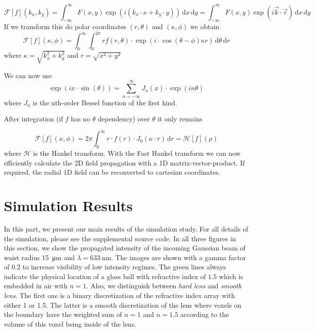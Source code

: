 \documentclass[a4paper,12pt]{article}
\begin{document}
\begin{equation}
\mathcal{F}[f](k_x, k_y) = \int_{-\infty}^{\infty} F(x,y) \exp(i (k_x \cdot x + k_y \cdot y)) \,\mathrm{d}x\, \mathrm{d}y = \int_{-\infty}^{\infty} F(x,y) \exp(i \vec k \cdot \vec r) \,\mathrm{d}x\, \mathrm{d}y
\end{equation}
If we transform this do polar coordinates $(r, \theta)$ and $(\kappa, \phi)$ we obtain
\begin{equation}
\mathcal{F}[f](\kappa, \phi) = \int_{0}^{\infty} \int_{0}^{2\pi} r f(r, \theta)\cdot \exp(i \cdot \cos(\theta - \phi) \kappa r)  \,\mathrm{d}\theta\, \mathrm{d}r
\end{equation}
where $\kappa = \sqrt{k_x^2 + k_y^2}$ and $r=\sqrt{x^2 + y^2}$

We can now use
\begin{equation}
\exp(i x \cdot \sin(\theta)) = \sum_{n=-\infty}^{\infty} J_n(x) \cdot \exp(i n \theta)
\end{equation}
where $J_n$ is the nth-order Bessel function of the first kind.

After integration (if $f$ has no $\theta$ dependency) over $\theta$ it only remains

\begin{equation}
\mathcal{F}[f](\kappa, \phi) = 2\pi \int_{0}^{\infty} r \cdot f(r) \cdot J_0(\kappa \cdot r) \, \mathrm{d}r = \mathcal{H}[f](\rho)
\end{equation}
where $\mathcal{H}$ is the Hankel transform.
With the Fast Hankel transform \cite{Guizar-Sicairos_Gutiérrez-Vega_2004} we can now efficiently calculate the 2D field propagation with a 1D matrix-vector-product. If required, the radial 1D field can be reconverted to cartesian coordinates. 

\section{Simulation Results}
\label{sec:sim}
In this part, we present our main results of the simulation study. For all details of the simulation, please see the supplemental source code.
In all three figures in this section, we show the propagated intensity of the incoming Gaussian beam of waist radius \SI{15}{\micro\meter} and $\lambda=\SI{633}{\nano\meter}$. The images are shown with a gamma factor of $0.2$ to increase visibility of low intensity regimes. The green lines always indicate the physical location of a glass ball with refractive index of $1.5$ which is embedded in air with $n=1$.
Also, we distinguish between \textit{hard lens} and \textit{smooth lens}. The first one is a binary discretization of the refractive index array with either 1 or 1.5. The latter is a smooth discretization of the lens where voxels on the boundary have the weighted sum of $n=1$ and $n=1.5$ according to the volume of this voxel being inside of the lens.
\end{document}
